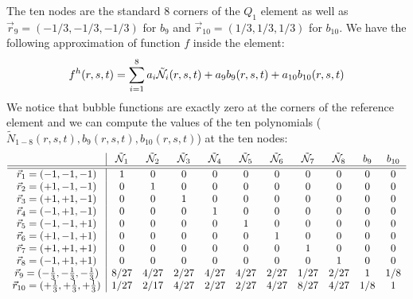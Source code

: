 The ten nodes are the standard 8 corners of the $Q_1$ element as well  
as $\vec{r}_9=(-1/3,-1/3,-1/3)$ for $b_9$ and 
$\vec{r}_{10}=(1/3,1/3,1/3)$ for $b_{10}$.
We have the following approximation of function $f$ inside the element:
\[
f^h(r,s,t) = \sum_{i=1}^{8} a_i \tilde{{\mathcal{N}}}_i(r,s,t) + a_9 b_9(r,s,t) + a_{10} b_{10}(r,s,t)
\]
We notice that bubble functions are exactly zero at the corners of the reference element and
we can compute the values of the ten polynomials ($\tilde{N}_{1-8}(r,s,t),b_9(r,s,t),b_{10}(r,s,t)$) 
at the ten nodes:
\[
\begin{array}{c|cccccccccc}
 & \tilde{{\mathcal{N}}}_1 & \tilde{{\mathcal{N}}}_2 & \tilde{{\mathcal{N}}}_3 & \tilde{{\mathcal{N}}}_4 & \tilde{{\mathcal{N}}}_5 
 & \tilde{{\mathcal{N}}}_6 & \tilde{{\mathcal{N}}}_7 & \tilde{{\mathcal{N}}}_8 & b_9 & b_{10}\\
 \hline\hline
\vec{r}_1=(-1,-1,-1)    &1 &0 &0 &0 &0 &0 &0 &0 &0 &0 \\
\vec{r}_2=(+1,-1,-1)    &0 &1 &0 &0 &0 &0 &0 &0 &0 &0 \\
\vec{r}_3=(+1,+1,-1)    &0 &0 &1 &0 &0 &0 &0 &0 &0 &0 \\
\vec{r}_4=(-1,+1,-1)    &0 &0 &0 &1 &0 &0 &0 &0 &0 &0 \\
\vec{r}_5=(-1,-1,+1)    &0 &0 &0 &0 &1 &0 &0 &0 &0 &0 \\
\vec{r}_6=(+1,-1,+1)    &0 &0 &0 &0 &0 &1 &0 &0 &0 &0 \\
\vec{r}_7=(+1,+1,+1)    &0 &0 &0 &0 &0 &0 &1 &0 &0 &0 \\
\vec{r}_8=(-1,+1,+1)    &0 &0 &0 &0 &0 &0 &0 &1 &0 &0 \\
\vec{r}_9=(-\frac13,-\frac13,-\frac13)    &8/27 & 4/27 & 2/27  & 4/27 & 4/27 & 2/27& 1/27& 2/27 &1 & 1/8\\
\vec{r}_{10}=(+\frac13,+\frac13,+\frac13) &1/27 & 2/17 & 4/27 & 2/27 & 2/27& 4/27& 8/27& 4/27& 1/8  &1 \\
\end{array}
\]




